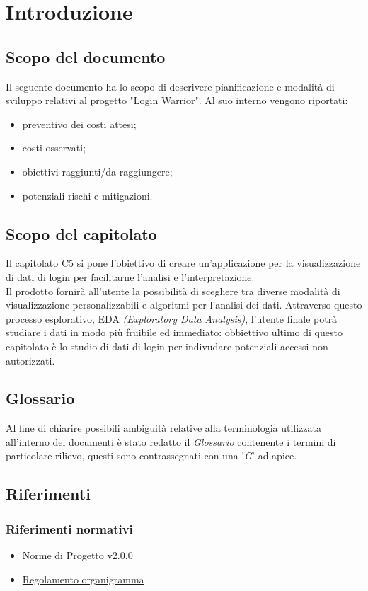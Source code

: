 \section{Introduzione}
\subsection{Scopo del documento}
Il seguente documento ha lo scopo di descrivere pianificazione e modalità di sviluppo relativi al progetto "Login Warrior".
Al suo interno vengono riportati:
\begin{itemize}
    \item preventivo dei costi attesi;
    \item costi osservati;
    \item obiettivi raggiunti/da raggiungere;
    \item potenziali rischi e mitigazioni.
\end{itemize} 

\subsection{Scopo del capitolato}
Il capitolato C5 si pone l'obiettivo di creare un'applicazione per la visualizzazione di dati di login 
per facilitarne l'analisi e l'interpretazione.\\ 
Il prodotto fornirà all'utente la possibilità di scegliere tra diverse
modalità di visualizzazione personalizzabili e algoritmi per l'analisi dei dati. 
Attraverso questo processo esplorativo, EDA \textit{(Exploratory Data Analysis)},
l'utente finale potrà studiare i dati in modo più fruibile ed immediato: obbiettivo ultimo 
di questo capitolato è lo studio di dati di login per indivudare potenziali accessi non autorizzati.

\subsection{Glossario}
Al fine di chiarire possibili ambiguità relative alla terminologia utilizzata all'interno dei documenti è stato redatto il \textit{Glossario} contenente i termini di particolare rilievo,
questi sono contrassegnati con una '\textit{G}' ad apice. 

\subsection{Riferimenti}
\subsubsection{Riferimenti normativi}
\begin{itemize}
    \item Norme di Progetto v2.0.0
    \item \href{https://www.math.unipd.it/~tullio/IS-1/2021/Progetto/Capitolati.html}{Regolamento organigramma}
\end{itemize}
